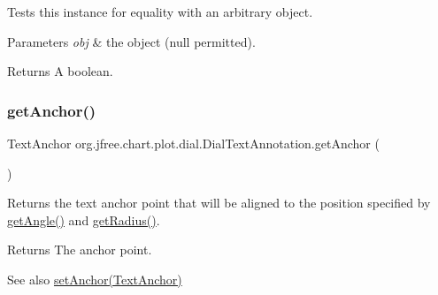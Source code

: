Tests this instance for equality with an arbitrary object.


\begin{DoxyParams}{Parameters}
{\em obj} & the object ({\ttfamily null} permitted).\\
\hline
\end{DoxyParams}
\begin{DoxyReturn}{Returns}
A boolean. 
\end{DoxyReturn}
\mbox{\label{classorg_1_1jfree_1_1chart_1_1plot_1_1dial_1_1_dial_text_annotation_a784089eb314baac5cacb0973fb328b92}} 
\subsubsection{\texorpdfstring{get\+Anchor()}{getAnchor()}}
{\footnotesize\ttfamily Text\+Anchor org.\+jfree.\+chart.\+plot.\+dial.\+Dial\+Text\+Annotation.\+get\+Anchor (\begin{DoxyParamCaption}{ }\end{DoxyParamCaption})}

Returns the text anchor point that will be aligned to the position specified by \mbox{\hyperlink{classorg_1_1jfree_1_1chart_1_1plot_1_1dial_1_1_dial_text_annotation_ac5edd17a18442f02b1fda90fdc71b5ba}{get\+Angle()}} and \mbox{\hyperlink{classorg_1_1jfree_1_1chart_1_1plot_1_1dial_1_1_dial_text_annotation_a67f7b7e58b013b48901d0d80a22bbef5}{get\+Radius()}}.

\begin{DoxyReturn}{Returns}
The anchor point.
\end{DoxyReturn}
\begin{DoxySeeAlso}{See also}
\mbox{\hyperlink{classorg_1_1jfree_1_1chart_1_1plot_1_1dial_1_1_dial_text_annotation_adb70dd46a09f66cba42bca86d1c59f0a}{set\+Anchor(\+Text\+Anchor)}} 
\end{DoxySeeAlso}
\mbox{\label{classorg_1_1jfree_1_1chart_1_1plot_1_1dial_1_1_dial_text_annotation_ac5edd17a18442f02b1fda90fdc71b5ba}} 
